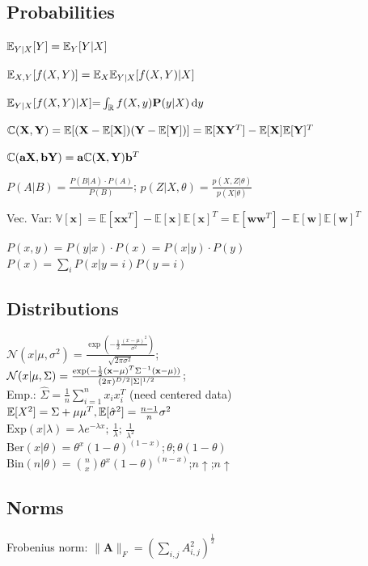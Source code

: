 \subsection*{Probabilities}

$\mathbb{E}_{Y|X}[Y]=\mathbb{E}_{Y}[Y|X]$

$\mathbb{E}_{X,Y}[f(X,Y)]=\mathbb{E}_{X}\mathbb{E}_{Y|X}[f(X,Y)|X]$

$\mathbb{E}_{Y|X}[f(X,Y)|X]{=}\int_\mathbb{R}f(X,y)\mathrm{\textbf{P}}(y|X)\operatorname{d\!} y$

$\mathbb{C}(\mathbf{X},\mathbf{Y})=\mathbb{E}[(\mathbf{X}-\mathbb{E}[\mathbf{X}])(\mathbf{Y}-\mathbb{E}[\mathbf{Y}])] = \mathbb{E}[\mathbf{X}\mathbf{Y}^T]-\mathbb{E}[\mathbf{X}]\mathbb{E}[\mathbf{Y}]^T$

$\mathbb{C}(\mathbf{a}\mathbf{X},\mathbf{b}\mathbf{Y})=\mathbf{a}\mathbb{C}(\mathbf{X},\mathbf{Y})\mathbf{b}^T$

$P(A|B) = \frac{P(B|A) \cdot P(A)}{P(B)}$; $p(Z|X,\theta) = \frac{p(X,Z|\theta)}{p(X|\theta)}$

Vec. Var: $\mathbb V[\mathbf x]=\mathbb E[\mathbf x\mathbf x^T]-\mathbb E[\mathbf x]\mathbb E[\mathbf x]^T=\mathbb E[\mathbf w\mathbf w^T]-\mathbb E[\mathbf w]\mathbb E[\mathbf w]^T$

$P(x,y) = P(y|x) \cdot  P(x) = P(x|y) \cdot P(y)$
$P(x)=\sum_i P(x|y=i)P(y=i)$

\subsection*{Distributions}
$\mathcal{N}(x|\mu, \sigma^2)=\frac{\exp(-\frac{1}{2}\frac{(x-\mu)^2}{\sigma^2})}{\sqrt{2\pi\sigma^2}}$;\\
$\mathcal{N}(x|\mu, \Sigma)= \frac{\exp(-\frac{1}{2}(\mathbf{x}-\mu)^T\Sigma^{-1}(\mathbf{x}-\mu))}{(2\pi)^{D/2}|\Sigma|^{1/2}}$;\\
Emp.: $\hat{\Sigma} = \frac{1}{n}\sum_{i=1}^n x_i x_i^T$ (need centered data)\\
$\mathbb{E}[X^2]= \Sigma+ \mu\mu^T, \mathbb{E}[\hat{\sigma}^2]=\frac{n-1}{n}\sigma^2 $\\
$\mathrm{Exp}(x|\lambda){=}\lambda e^{-\lambda x}; \, \frac{1}{\lambda}; \, \frac{1}{\lambda^2}$\\
$\mathrm{Ber}(x|\theta){=}\theta^x (1{-}\theta)^{(1-x)}$;$ \, \theta$;$ \, \theta(1-\theta)$\\
$\mathrm{Bin}(n|\theta)=\binom{n}{x}\theta^{x}(1-\theta)^{(n-x)}$;$n\uparrow$;$n\uparrow$

\subsection*{Norms}
Frobenius norm: $\|\mathbf A\|_F = \left(\sum_{i,j}A_{i,j}^2\right)^\frac{1}{2}$

